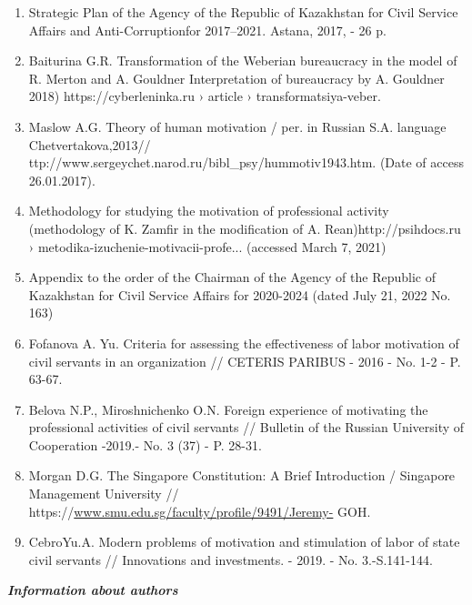 \begin{enumerate}
\item
Strategic Plan of the Agency of the Republic of Kazakhstan for Civil
Service Affairs and Anti-Corruptionfor 2017--2021. Astana, 2017, - 26 p.

\item
Baiturina G.R. Transformation of the Weberian bureaucracy in the
model of R. Merton and A. Gouldner Interpretation of bureaucracy by A.
Gouldner 2018) https://cyberleninka.ru › article ›
transformatsiya-veber.

\item
Maslow A.G. Theory of human motivation / per. in Russian S.A.
language Chetvertakova,2013//
ttp://www.sergeychet.narod.ru/bibl\_psy/hummotiv1943.htm. (Date of
access 26.01.2017).

\item
Methodology for studying the motivation of professional activity
(methodology of K. Zamfir in the modification of A.
Rean)http://psihdocs.ru › metodika-izuchenie-motivacii-profe...
(accessed March 7, 2021)

\item
Appendix to the order of the Chairman of the Agency of the Republic
of Kazakhstan for Civil Service Affairs for 2020-2024 (dated July 21,
2022 No. 163)

\item
Fofanova A. Yu. Criteria for assessing the effectiveness of labor
motivation of civil servants in an organization // CETERIS PARIBUS -
2016 - No. 1-2 - P. 63-67.

\item
Belova N.P., Miroshnichenko O.N. Foreign experience of motivating
the professional activities of civil servants // Bulletin of the Russian
University of Cooperation -2019.- No. 3 (37) - P. 28-31.

\item
Morgan D.G. The Singapore Constitution: A Brief Introduction /
Singapore Management University //
https://\href{http://www.smu.edu.sg/faculty/profile/9491/Jeremy-}{www.smu.edu.sg/faculty/profile/9491/Jeremy-}
GOH.

\item
CebroYu.A. Modern problems of motivation and stimulation of labor of
state civil servants // Innovations and investments. - 2019. - No.
3.-S.141-144.
\end{enumerate}

\emph{{\bfseries Information about authors}}

